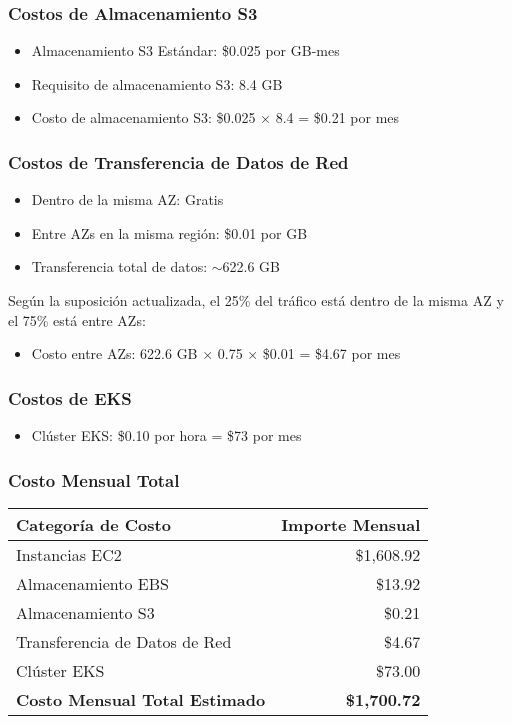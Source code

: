 \subsubsection{Costos de Almacenamiento S3}

\begin{itemize}
    \item Almacenamiento S3 Estándar: \$0.025 por GB-mes
    \item Requisito de almacenamiento S3: 8.4 GB
    \item Costo de almacenamiento S3: \$0.025 × 8.4 = \$0.21 por mes
\end{itemize}

\subsubsection{Costos de Transferencia de Datos de Red}

\begin{itemize}
    \item Dentro de la misma AZ: Gratis
    \item Entre AZs en la misma región: \$0.01 por GB
    \item Transferencia total de datos: $\sim$622.6 GB
\end{itemize}

Según la suposición actualizada, el 25\% del tráfico está dentro de la misma AZ y el 75\% está entre AZs:
\begin{itemize}
    \item Costo entre AZs: 622.6 GB × 0.75 × \$0.01 = \$4.67 por mes
\end{itemize}

\subsubsection{Costos de EKS}

\begin{itemize}
    \item Clúster EKS: \$0.10 por hora = \$73 por mes
\end{itemize}

\subsubsection{Costo Mensual Total}

\begin{table}[h]
\centering
\begin{tabular}{|l|r|}
\hline
\textbf{Categoría de Costo} & \textbf{Importe Mensual} \\
\hline
Instancias EC2 & \$1,608.92 \\
\hline
Almacenamiento EBS & \$13.92 \\
\hline
Almacenamiento S3 & \$0.21 \\
\hline
Transferencia de Datos de Red & \$4.67 \\
\hline
Clúster EKS & \$73.00 \\
\hline
\textbf{Costo Mensual Total Estimado} & \textbf{\$1,700.72} \\
\hline
\end{tabular}
\end{table}

